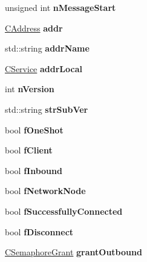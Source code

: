 \begin{DoxyCompactItemize}
unsigned int {\bfseries n\+Message\+Start}
\item 
\mbox{\label{class_c_node_a3993ecb1de2a2135a3cf0904346a6f88}} 
\mbox{\hyperlink{class_c_address}{C\+Address}} {\bfseries addr}
\item 
\mbox{\label{class_c_node_a3155cd313d85ec3ff691f8259a5f5345}} 
std\+::string {\bfseries addr\+Name}
\item 
\mbox{\label{class_c_node_a1b6517682efa0709f44780a95384c4ec}} 
\mbox{\hyperlink{class_c_service}{C\+Service}} {\bfseries addr\+Local}
\item 
\mbox{\label{class_c_node_a99173eb3cef17e699ba21a5249ac33d2}} 
int {\bfseries n\+Version}
\item 
\mbox{\label{class_c_node_afb24fb33019af5c4085412fe3898cf01}} 
std\+::string {\bfseries str\+Sub\+Ver}
\item 
\mbox{\label{class_c_node_a2bb91c9968a9f855c05b1121100a8797}} 
bool {\bfseries f\+One\+Shot}
\item 
\mbox{\label{class_c_node_a721e2470c2c961b7599768a14be68781}} 
bool {\bfseries f\+Client}
\item 
\mbox{\label{class_c_node_a64b2550ec558b6106ebc122d450ad35b}} 
bool {\bfseries f\+Inbound}
\item 
\mbox{\label{class_c_node_a933adb2b192939545a01d602b1d7b53a}} 
bool {\bfseries f\+Network\+Node}
\item 
\mbox{\label{class_c_node_ab58c1772b2698e348d86002f34254119}} 
bool {\bfseries f\+Successfully\+Connected}
\item 
\mbox{\label{class_c_node_af2f7ea958313974e8a948292f060922e}} 
bool {\bfseries f\+Disconnect}
\item 
\mbox{\label{class_c_node_a4bb25f8bdeeaff5e8cb08abc97bbc44d}} 
\mbox{\hyperlink{class_c_semaphore_grant}{C\+Semaphore\+Grant}} {\bfseries grant\+Outbound}

\end{DoxyCompactItemize}
